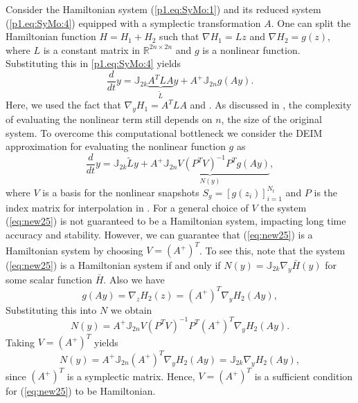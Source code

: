 Consider the Hamiltonian system (\ref{p1.eq:SyMo:1}) and its reduced system (\ref{p1.eq:SyMo:4}) equipped with a symplectic transformation $A$. One can split the Hamiltonian function $H = H_1 + H_2$ such that $\nabla H_1 = L z$ and $\nabla H_2 = g(z)$, where $L$ is a constant matrix in $\mathbb R^{2n\times 2n}$ and $g$ is a nonlinear function. Substituting this in \eqref{p1.eq:SyMo:4} yields
\begin{equation} \label{eq:new24}
	\frac{d}{dt} y = \mathbb J_{2k}\underbrace{ A^T L A}_{\tilde L} y + A^+ \mathbb J_{2n} g(Ay).
\end{equation}
Here, we used the fact that $\nabla_y H_1 = A^TLA$ and . As discussed in , the complexity of evaluating the nonlinear term still depends on $n$, the size of the original system. To overcome this computational bottleneck we consider the DEIM approximation for evaluating the nonlinear function $g$ as
\begin{equation} \label{eq:new25}
	\frac{d}{dt} y = \mathbb J_{2k} \tilde L y + \underbrace{ A^+ \mathbb J_{2n} V (P^TV)^{-1} P^T g(Ay) }_{N( y)},
\end{equation}
where $V$ is a basis for the nonlinear snapshots $S_{g} = [g(z_i)]_{i=1}^{N_t}$ and $P$ is the index matrix for interpolation in . For a general choice of $V$ the system (\ref{eq:new25}) is not guaranteed to be a Hamiltonian system, impacting long time accuracy and stability. However, we can guarantee that (\ref{eq:new25}) is a Hamiltonian system by choosing $V=(A^+)^T$. To see this, note that the system (\ref{eq:new25}) is a Hamiltonian system if and only if $N(y) = \mathbb J_{2k} \nabla_{y} \bar H(y)$ for some scalar function $\bar H$. Also we have 
\begin{equation} \label{eq:new26}
	g(Ay) = \nabla_{z} H_2(z) = (A^+)^T \nabla_{y} H_2(Ay),
\end{equation}
Substituting this into $N$ we obtain
\begin{equation} \label{eq:new27}
	N(y)= A^+ \mathbb J_{2n} V (P^TV)^{-1} P^T  (A^+)^T \nabla_{ y} H_2(Ay).
\end{equation}
Taking $V = (A^+)^T$ yields
\begin{equation} \label{eq:new28}
	N(y) = A^+ \mathbb J_{2n}(A^+)^T \nabla_{y} H_2(Ay) = \mathbb J_{2k} \nabla_{y} H_2(A y),
\end{equation}
since $(A^+)^T$ is a symplectic matrix. Hence, $V = (A^+)^T$ is a sufficient condition for (\ref{eq:new25}) to be Hamiltonian. 

